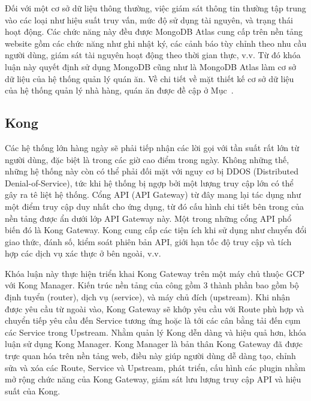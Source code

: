 Đối với một cơ sở dữ liệu thông thường, việc giám sát thông tin thường tập trung vào các loại như hiệu suất truy vấn, mức độ sử dụng tài nguyên, và trạng thái hoạt động.
Các chức năng này đều được MongoDB Atlas cung cấp trên nền tảng website gồm các chức năng như ghi nhật ký, các cảnh báo tùy chỉnh theo nhu cầu người dùng, giám sát tài nguyên hoạt động theo thời gian thực, v.v.
Từ đó khóa luận này quyết định sử dụng MongoDB cũng như là MongoDB Atlas làm cơ sở dữ liệu của hệ thống quản lý quán ăn.
Về chi tiết về mặt thiết kế cơ sở dữ liệu của hệ thống quản lý nhà hàng, quán ăn được đề cập ở Mục~.
\subsection{Kong}
Các hệ thống lớn hàng ngày sẽ phải tiếp nhận các lời gọi với tần suất rất lớn từ người dùng, đặc biệt là trong các giờ cao điểm trong ngày.
Không những thế, những hệ thống này còn có thể phải đối mặt với nguy cơ bị DDOS (Distributed Denial-of-Service), tức khi hệ thống bị ngợp bởi một lượng truy cập lớn có thể gây ra tê liệt hệ thống.
Cổng API (API Gateway) từ đây mang lại tác dụng như một điểm truy cập duy nhất cho ứng dụng, từ đó cấu hình chi tiết bên trong của nền tảng được ẩn dưới lớp API Gateway này.
Một trong những cổng API phổ biến đó là Kong Gateway.
Kong cung cấp các tiện ích khi sử dụng như chuyển đổi giao thức, đánh số, kiểm soát phiên bản API, giới hạn tốc độ truy cập và tích hợp các dịch vụ xác thực ở bên ngoài, v.v.

Khóa luận này thực hiện triển khai Kong Gateway trên một máy chủ thuộc GCP với Kong Manager.
Kiến trúc nền tảng của công gồm 3 thành phần bao gồm bộ định tuyển (router), dịch vụ (service), và máy chủ đích (upstream).
Khi nhận được yêu cầu từ ngoài vào, Kong Gateway sẽ khớp yêu cầu với Route phù hợp và chuyển tiếp yêu cầu đến Service tương ứng hoặc là tới các cân bằng tải đến cụm các Service trong Upstream.
Nhằm quản lý Kong dễn dàng và hiệu quả hơn, khóa luận sử dụng Kong Manager.
Kong Manager là bản thân Kong Gateway đã được trực quan hóa trên nền tảng web, điều này giúp người dùng dễ dàng tạo, chỉnh sửa và xóa các Route, Service và Upstream, phát triển, cấu hình các plugin nhằm mở rộng chức năng của Kong Gateway, giám sát lưu lượng truy cập API và hiệu suất của Kong.
